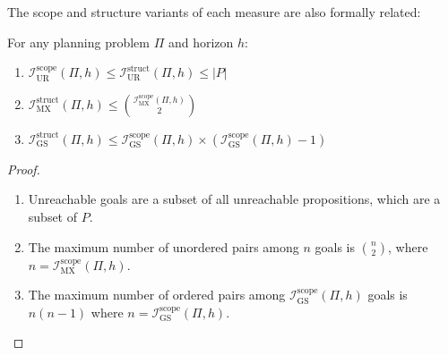 

The scope and structure variants of each measure are also formally related:

\begin{prop}
    \label{prop:scope_structure_bounds}
    For any planning problem $\Pi$ and horizon $h$:
    \begin{enumerate}
        \item $\mathcal{I}^{\text{scope}}_{\text{UR}}(\Pi, h) \leq \mathcal{I}^{\text{struct}}_{\text{UR}}(\Pi, h) \leq |P|$
        \item $\mathcal{I}^{\text{struct}}_{\text{MX}}(\Pi, h) \leq \binom{\mathcal{I}^{\text{scope}}_{\text{MX}}(\Pi, h)}{2}$
        \item $\mathcal{I}^{\text{struct}}_{\text{GS}}(\Pi, h) \leq \mathcal{I}^{\text{scope}}_{\text{GS}}(\Pi, h) \times (\mathcal{I}^{\text{scope}}_{\text{GS}}(\Pi, h) - 1)$
    \end{enumerate}
\end{prop}
\begin{proof}
    \begin{enumerate}
        \item Unreachable goals are a subset of all unreachable propositions, which are a subset of $P$.
        \item The maximum number of unordered pairs among $n$ goals is $\binom{n}{2}$, where $n = \mathcal{I}^{\text{scope}}_{\text{MX}}(\Pi, h)$.
        \item The maximum number of ordered pairs among $\mathcal{I}^{\text{scope}}_{\text{GS}}(\Pi, h)$ goals is $n(n-1)$ where $n = \mathcal{I}^{\text{scope}}_{\text{GS}}(\Pi, h)$.
    \end{enumerate}
\end{proof}
